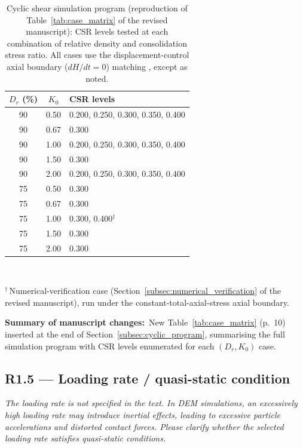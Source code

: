\documentclass[11pt,a4paper]{article}
\newenvironment{rcomment}
  {\begin{leftbar}\color{black!75}\itshape}
  {\end{leftbar}\vspace{0.3em}}
\newcommand{\changed}[1]{\par\noindent\textbf{Summary of manuscript changes:}\ #1\par}
\newcommand{\manref}[1]{(#1)}                  %
\newcommand{\Kzero}{\ensuremath{K_0}}
\begin{document}
\begin{table}[htbp]
  \centering
  \caption{Cyclic shear simulation program (reproduction of Table~\ref{tab:case_matrix} of the revised manuscript): CSR levels tested at each combination of relative density and consolidation stress ratio. All cases use the displacement-control axial boundary ($dH/dt=0$) matching \citet{Ishihara1985}, except as noted.}
  \label{tab:rl_case_matrix}
  \begin{tabular}{@{}ccl@{}}
    \toprule
    $D_r$ (\%) & $\Kzero$ & CSR levels \\
    \midrule
    90 & 0.50 & 0.200, 0.250, 0.300, 0.350, 0.400 \\
    90 & 0.67 & 0.300 \\
    90 & 1.00 & 0.200, 0.250, 0.300, 0.350, 0.400 \\
    90 & 1.50 & 0.300 \\
    90 & 2.00 & 0.200, 0.250, 0.300, 0.350, 0.400 \\
    \midrule
    75 & 0.50 & 0.300 \\
    75 & 0.67 & 0.300 \\
    75 & 1.00 & 0.300, 0.400$^{\dagger}$ \\
    75 & 1.50 & 0.300 \\
    75 & 2.00 & 0.300 \\
    \bottomrule
  \end{tabular}\\[2pt]
  \begin{minipage}{0.95\linewidth}
    \footnotesize $^{\dagger}$\,Numerical-verification case (Section~\ref{subsec:numerical_verification} of the revised manuscript), run under the constant-total-axial-stress axial boundary.
  \end{minipage}
\end{table}

\changed{New Table~\ref{tab:case_matrix} \manref{p.~10} inserted at
the end of Section~\ref{subsec:cyclic_program}, summarising the full
simulation program with CSR levels enumerated for each
$(D_r, \Kzero)$ case.}

\subsection*{R1.5 --- Loading rate / quasi-static condition}

\begin{rcomment}
The loading rate is not specified in the text. In DEM simulations, an
excessively high loading rate may introduce inertial effects, leading to
excessive particle accelerations and distorted contact forces. Please
clarify whether the selected loading rate satisfies quasi-static conditions.
\end{rcomment}
\end{document}
